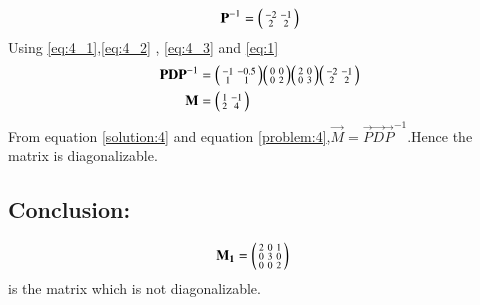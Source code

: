 \documentclass[journal,12pt,twocolumn]{IEEEtran}
\begin{document}
\begin{align}
	\mathbf{P}^{-1}=\begin{psmallmatrix}-2&-1\\2&2\end{psmallmatrix}\label{eq:4_3}
\end{align}
Using \eqref{eq:4_1},\eqref{eq:4_2} , \eqref{eq:4_3} and \eqref{eq:1}
\begin{align}
	\mathbf{P}\mathbf{D}\mathbf{P}^{-1}&=\begin{psmallmatrix}-1&-0.5\\1&1\end{psmallmatrix}\begin{psmallmatrix}0&0\\0&2\end{psmallmatrix}\begin{psmallmatrix}2&0\\0&3\end{psmallmatrix}\begin{psmallmatrix}-2&-1\\2&2\end{psmallmatrix}\\
	\mathbf{M}&=\begin{psmallmatrix}1&-1\\2&4\end{psmallmatrix}\label{solution:4}	
\end{align}
From equation \eqref{solution:4} and equation \eqref{problem:4},$\vec{M} = \vec{P}\vec{D}\vec{P}^{-1}$.Hence the matrix is diagonalizable. 
\subsection{Conclusion: }
\begin{align}
	\mathbf{M_1}&=\begin{psmallmatrix}2&0&1\\0&3&0\\0 & 0&2\end{psmallmatrix}\nonumber
\end{align}
is the matrix which is not diagonalizable.

	
\end{document}

